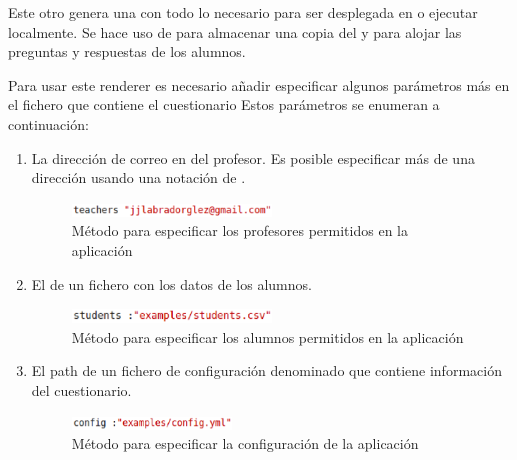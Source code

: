 

Este otro  genera una   con todo lo necesario para ser desplegada en  o ejecutar localmente. 
Se hace uso de  para almacenar una copia del  y para alojar las preguntas y respuestas de los alumnos.

Para usar este renderer es necesario a\~{n}adir especificar algunos par\'ametros m\'as en el fichero  que contiene el cuestionario
Estos par\'ametros se enumeran a continuaci\'on:

\begin{enumerate}
  \item La direcci\'on de correo en  del profesor. Es posible especificar m\'as de una direcci\'on usando una notaci\'on
  de .
  \begin{figure}[!th]
  \begin{center}
  \includegraphics[width=0.5\textwidth]{images/teachers.eps}
  \caption{M\'etodo para especificar los profesores permitidos en la aplicaci\'on}
  \label{fig:teachers}
  \end{center}
  \end{figure}
  
  \item El  de un fichero  con los datos de los alumnos.
  \begin{figure}[!th]
  \begin{center}
  \includegraphics[width=0.5\textwidth]{images/students.eps}
  \caption{M\'etodo para especificar los alumnos permitidos en la aplicaci\'on}
  \label{fig:students}
  \end{center}
  \end{figure}
  \newpage
  
  \item El path de un fichero de configuraci\'on denominado  que contiene informaci\'on del cuestionario.
  \begin{figure}[!th]
  \begin{center}
  \includegraphics[width=0.4\textwidth]{images/config.eps}
  \caption{M\'etodo para especificar la configuraci\'on de la aplicaci\'on}
  \label{fig:config}
  \end{center}
  \end{figure}
  
\end{enumerate}

